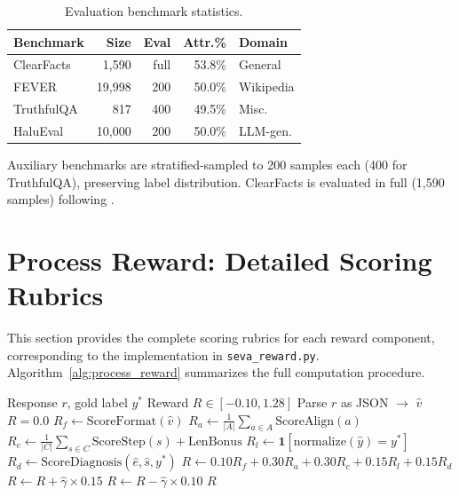 \documentclass[11pt]{article}
\begin{document}
\begin{table}[h]
\centering
\small
\caption{Evaluation benchmark statistics.}
\label{tab:eval_data}
\begin{tabular}{lrrrl}
\toprule
\textbf{Benchmark} & \textbf{Size} & \textbf{Eval} & \textbf{Attr.\%} & \textbf{Domain} \\
\midrule
ClearFacts & 1,590 & full & 53.8\% & General \\
FEVER & 19,998 & 200 & 50.0\% & Wikipedia \\
TruthfulQA & 817 & 400 & 49.5\% & Misc. \\
HaluEval & 10,000 & 200 & 50.0\% & LLM-gen. \\
\bottomrule
\end{tabular}
\end{table}

Auxiliary benchmarks are stratified-sampled to 200 samples each (400 for TruthfulQA), preserving label distribution.
ClearFacts is evaluated in full (1,590 samples) following \citet{seo2025vtv}.


\section{Process Reward: Detailed Scoring Rubrics}
\label{app:reward}
\label{app:reward_detail}

This section provides the complete scoring rubrics for each reward component, corresponding to the implementation in \texttt{seva\_reward.py}.
Algorithm~\ref{alg:process_reward} summarizes the full computation procedure.

\begin{algorithm}[h]
\small
\caption{Process Reward Computation}
\label{alg:process_reward}
\begin{algorithmic}[1]
\REQUIRE Response $r$, gold label $y^*$
\ENSURE Reward $R \in [-0.10, 1.28]$
\STATE Parse $r$ as JSON $\to$ $\hat{v}$
  \RETURN $R = 0.0$
\ENDIF
\STATE $R_f \gets \text{ScoreFormat}(\hat{v})$ 
\STATE $R_a \gets \frac{1}{|A|}\sum_{a \in A} \text{ScoreAlign}(a)$
\STATE $R_c \gets \frac{1}{|C|}\sum_{s \in C} \text{ScoreStep}(s) + \text{LenBonus}$
\STATE $R_l \gets \mathbf{1}[\text{normalize}(\hat{y}) = y^*]$
\STATE $R_d \gets \text{ScoreDiagnosis}(\hat{e}, \hat{s}, y^*)$
\STATE $R \gets 0.10 R_f + 0.30 R_a + 0.30 R_c + 0.15 R_l + 0.15 R_d$
  \STATE $R \gets R + \hat{\gamma} \times 0.15$ 
\ELSE
  \STATE $R \gets R - \hat{\gamma} \times 0.10$ 
\ENDIF
\RETURN $R$
\end{algorithmic}
\end{algorithm}
\end{document}

